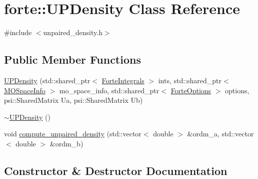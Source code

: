 \hypertarget{classforte_1_1_u_p_density}{}\section{forte\+:\+:U\+P\+Density Class Reference}
\label{classforte_1_1_u_p_density}


{\ttfamily \#include $<$unpaired\+\_\+density.\+h$>$}

\subsection*{Public Member Functions}
\begin{DoxyCompactItemize}
\item 
\mbox{\hyperlink{classforte_1_1_u_p_density_a4f0a83976c475af160617562786b8a23}{U\+P\+Density}} (std\+::shared\+\_\+ptr$<$ \mbox{\hyperlink{classforte_1_1_forte_integrals}{Forte\+Integrals}} $>$ ints, std\+::shared\+\_\+ptr$<$ \mbox{\hyperlink{classforte_1_1_m_o_space_info}{M\+O\+Space\+Info}} $>$ mo\+\_\+space\+\_\+info, std\+::shared\+\_\+ptr$<$ \mbox{\hyperlink{classforte_1_1_forte_options}{Forte\+Options}} $>$ options, psi\+::\+Shared\+Matrix Ua, psi\+::\+Shared\+Matrix Ub)
\item 
\mbox{\hyperlink{classforte_1_1_u_p_density_aa445f31bf03a2d761b47a83433b4cc1f}{$\sim$\+U\+P\+Density}} ()
\item 
void \mbox{\hyperlink{classforte_1_1_u_p_density_abe949d4aaca67fd3f46123cc0edfb04f}{compute\+\_\+unpaired\+\_\+density}} (std\+::vector$<$ double $>$ \&ordm\+\_\+a, std\+::vector$<$ double $>$ \&ordm\+\_\+b)
\end{DoxyCompactItemize}


\subsection{Constructor \& Destructor Documentation}
\mbox{\label{classforte_1_1_u_p_density_a4f0a83976c475af160617562786b8a23}} 
